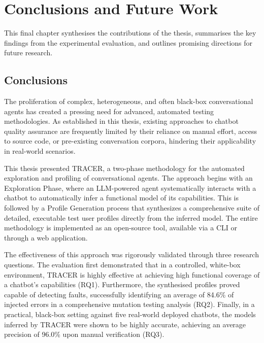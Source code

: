 
\chapter{Conclusions and Future Work}\label{chapter:conclusion}

This final chapter synthesises the contributions of the thesis,
summarises the key findings from the experimental evaluation,
and outlines promising directions for future research.

\section{Conclusions}

The proliferation of complex, heterogeneous, and often black-box conversational agents
has created a pressing need for advanced, automated testing methodologies.
As established in this thesis, existing approaches to chatbot quality assurance
are frequently limited by their reliance on manual effort,
access to source code, or pre-existing conversation corpora,
hindering their applicability in real-world scenarios.

This thesis presented \ac{TRACER}, a two-phase methodology
for the automated exploration and profiling of conversational agents.
The approach begins with an Exploration Phase,
where an \ac{LLM}-powered agent systematically interacts with a chatbot
to automatically infer a functional model of its capabilities.
This is followed by a Profile Generation process
that synthesizes a comprehensive suite of detailed, executable test user profiles
directly from the inferred model.
The entire methodology is implemented as an open-source tool,
available via a \ac{CLI} or through a web application.

The effectiveness of this approach
was rigorously validated through three research questions.
The evaluation first demonstrated that in a controlled, white-box environment,
\ac{TRACER} is highly effective
at achieving high functional coverage of a chatbot's capabilities (RQ1).
Furthermore, the synthesised profiles proved capable of detecting faults,
successfully identifying an average of 84.6\% of injected errors
in a comprehensive mutation testing analysis (RQ2).
Finally, in a practical, black-box setting against five real-world deployed chatbots,
the models inferred by \ac{TRACER} were shown to be highly accurate,
achieving an average precision of 96.0\% upon manual verification (RQ3).

